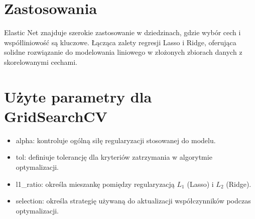 {}
\section*{Zastosowania }
\vspace{-1.0em}
\label{sec:ml_challenges}

\hspace{1.5cm} Elastic Net znajduje szerokie zastosowanie w dziedzinach, gdzie wybór cech i współliniowość są kluczowe. Łącząca zalety regresji Lasso i Ridge, oferująca solidne rozwiązanie do modelowania liniowego w złożonych zbiorach danych z skorelowanymi cechami.


{}
\section*{Użyte parametry dla GridSearchCV \cite{url_ElasticNet, url_grid_search}}
\vspace{-1.0em}
\label{sec:ml_challenges}

\begin{itemize}
\setlength\itemsep{-0.5em}
 \item  alpha: kontroluje ogólną siłę regularyzacji stosowanej do modelu.
\item tol: definiuje tolerancję dla kryteriów zatrzymania w algorytmie optymalizacji.
\item l1\_ratio: określa mieszankę pomiędzy regularyzacją $L_1$ (Lasso) i $L_2$ (Ridge).
\item selection: określa strategię używaną do aktualizacji współczynników podczas optymalizacji.
\end{itemize}
